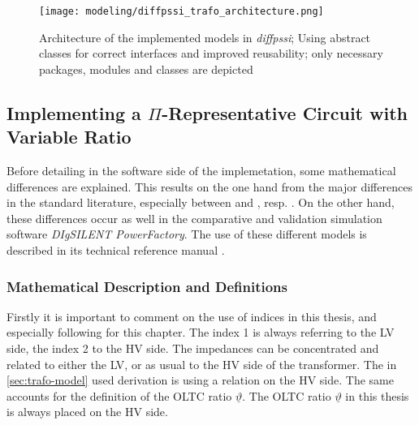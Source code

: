\begin{figure}[htbp!]
        \centering
        \texttt{[image: modeling/diffpssi\_trafo\_architecture.png]}
        \caption[Architecture of the implemented models in \textit{diffpssi}]{Architecture of the implemented models in \textit{diffpssi}; Using abstract classes for correct interfaces and improved reusability; only necessary packages, modules and classes are depicted}
        \label{fig:transformer-architecture}
\end{figure}


\subsection{Implementing a $\Pi$-Representative Circuit with Variable Ratio}

Before detailing in the software side of the implemetation, some mathematical differences are explained.
This results on the one hand from the major differences in the standard literature, especially between \textcite{machowski_2020} and \textcite{kundur_2022}, resp. \textcite{milano_2010}.
On the other hand, these differences occur as well in the comparative and validation simulation software \textit{DIgSILENT PowerFactory}.
The use of these different models is described in its technical reference manual \quelle. 

\subsubsection{Mathematical Description and Definitions}

Firstly it is important to comment on the use of indices in this thesis, and especially following for this chapter.
The index 1 is always referring to the \acs{LV} side, the index 2 to the \acs{HV} side. 
The impedances can be concentrated and related to either the \acs{LV}, or as usual to the \acs{HV} side of the transformer. 
The in \autoref{sec:trafo-model} used derivation is using a relation on the \acs{HV} side.
The same accounts for the definition of the \acs{OLTC} ratio $\underline{\vartheta}$.     
The \acs{OLTC} ratio $\underline{\vartheta}$ in this thesis is always placed on the HV side.

